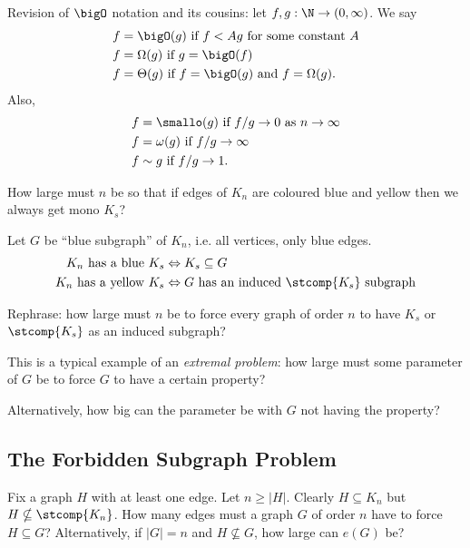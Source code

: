 \documentclass[a4paper]{article}
\newcommand*{\Omg}{\Omega}
\newcommand*{\bigT}{\Theta}
\newcommand*{\smallomg}{\omega}
\begin{document}
\iffalse

Revision of \(\bigO\) notation and its cousins: let \(f,g:\N\to (0,\infty)\). We say
\begin{align*}
  f &= \bigO(g) \text{ if } f< Ag \text{ for some constant } A \\
  f &= \Omg(g) \text{ if } g=\bigO(f) \\
  f &= \bigT(g) \text{ if } f=\bigO(g) \text{ and } f = \Omg(g).
\end{align*}
Also,
\begin{align*}
  f &= \smallo(g) \text{ if } f/g\to 0 \text{ as } n\to \infty \\
  f &= \smallomg(g) \text{ if } f/g\to \infty \\
  f &\sim g \text{ if } f/g\to 1.
\end{align*}



\begin{question}
  How large must \(n\) be so that if edges of \(K_n\) are coloured blue and yellow then we always get mono \(K_s\)?
\end{question}

Let \(G\) be ``blue subgraph'' of \(K_n\), i.e. all vertices, only blue edges.
\begin{align*}
  K_n \text{ has a blue } K_s &\Leftrightarrow K_s \subseteq G \\
  K_n \text{ has a yellow } K_s &\Leftrightarrow G \text{ has an induced } \stcomp{K_s} \text{ subgraph}
\end{align*}

Rephrase: how large must \(n\) be to force every graph of order \(n\) to have \(K_s\) or \(\stcomp{K_s}\) as an induced subgraph?

This is a typical example of an \emph{extremal problem}: how large must some parameter of \(G\) be to force \(G\) to have a certain property?

Alternatively, how big can the parameter be with \(G\) not having the property?

\subsection{The Forbidden Subgraph Problem}

Fix a graph \(H\) with at least one edge. Let \(n \geq |H|\). Clearly \(H \subseteq K_n\) but \(H \nsubseteq \stcomp{K_n}\). How many edges must a graph \(G\) of order \(n\) have to force \(H \subseteq G\)? Alternatively, if \(|G| = n\) and \(H \nsubseteq G\), how large can \(e(G)\) be?
\end{document}
